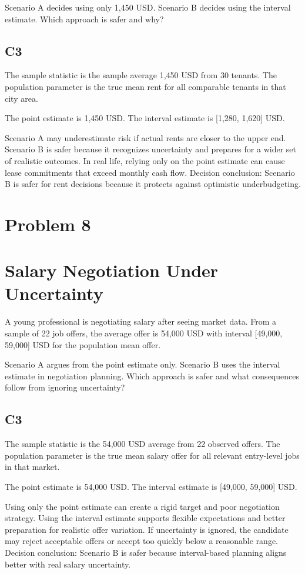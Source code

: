 \begin{ExamProblems}
		Scenario A decides using only 1,450 USD.
		Scenario B decides using the interval estimate.
		Which approach is safer and why?

		\subsection*{C3}
		The sample statistic is the sample average 1,450 USD from 30 tenants.
		The population parameter is the true mean rent for all comparable tenants in that city area.

		The point estimate is 1,450 USD.
		The interval estimate is [1,280, 1,620] USD.

		Scenario A may underestimate risk if actual rents are closer to the upper end.
		Scenario B is safer because it recognizes uncertainty and prepares for a wider set of realistic outcomes.
		In real life, relying only on the point estimate can cause lease commitments that exceed monthly cash flow.
		Decision conclusion: Scenario B is safer for rent decisions because it protects against optimistic underbudgeting.

		\newpage
		\item
		\section{Problem 8}
		\section{Salary Negotiation Under Uncertainty}
		A young professional is negotiating salary after seeing market data.
		From a sample of 22 job offers, the average offer is 54,000 USD with interval [49,000, 59,000] USD for the population mean offer.

		Scenario A argues from the point estimate only.
		Scenario B uses the interval estimate in negotiation planning.
		Which approach is safer and what consequences follow from ignoring uncertainty?

		\subsection*{C3}
		The sample statistic is the 54,000 USD average from 22 observed offers.
		The population parameter is the true mean salary offer for all relevant entry-level jobs in that market.

		The point estimate is 54,000 USD.
		The interval estimate is [49,000, 59,000] USD.

		Using only the point estimate can create a rigid target and poor negotiation strategy.
		Using the interval estimate supports flexible expectations and better preparation for realistic offer variation.
		If uncertainty is ignored, the candidate may reject acceptable offers or accept too quickly below a reasonable range.
		Decision conclusion: Scenario B is safer because interval-based planning aligns better with real salary uncertainty.


\end{ExamProblems}
